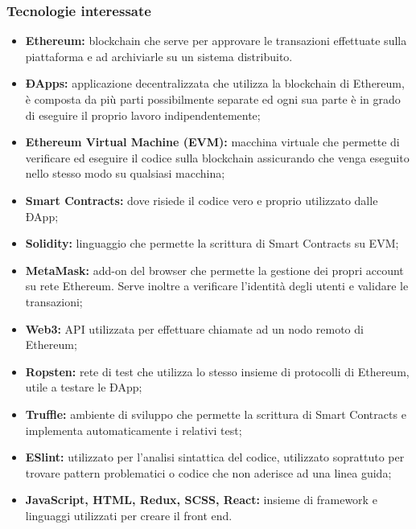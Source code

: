\documentclass{article}
\begin{document}
	\subsubsection{Tecnologie interessate}
	\begin{itemize}
		\item \textbf{Ethereum:} blockchain che serve per approvare le transazioni effettuate sulla piattaforma e ad archiviarle su un sistema distribuito. 
		
		\item \textbf{ÐApps:} applicazione decentralizzata che utilizza la blockchain di Ethereum, è composta da più parti possibilmente separate ed ogni sua parte è in grado di eseguire il proprio lavoro indipendentemente; 
		
		\item \textbf{Ethereum Virtual Machine (EVM):} macchina virtuale che permette di verificare ed eseguire il codice sulla blockchain assicurando che venga eseguito nello stesso modo su qualsiasi macchina;
		
		\item \textbf{Smart Contracts:} dove risiede il codice vero e proprio utilizzato dalle ÐApp;
	
		\item \textbf{Solidity:} linguaggio che permette la scrittura di Smart Contracts su EVM;
	
		\item \textbf{MetaMask:} add-on del browser che permette la gestione dei propri account su rete Ethereum. Serve inoltre a verificare l'identità degli utenti e validare le transazioni;
	
		\item \textbf{Web3:} API utilizzata per effettuare chiamate ad un nodo remoto di Ethereum;
	
		\item\textbf{Ropsten:} rete di test che utilizza lo stesso insieme di protocolli di Ethereum, utile a testare le ÐApp;
	
		\item\textbf{Truffle:} ambiente di sviluppo che permette la scrittura di Smart Contracts e implementa automaticamente i relativi test;
		
		\item\textbf{ESlint:} utilizzato per l'analisi sintattica del codice, utilizzato soprattuto per trovare pattern problematici o codice che non aderisce ad una linea guida;
		
		\item \textbf{JavaScript, HTML, Redux, SCSS, React:} insieme di framework e linguaggi utilizzati per creare il front end.
	
 	\end{itemize}
	
\end{document}
